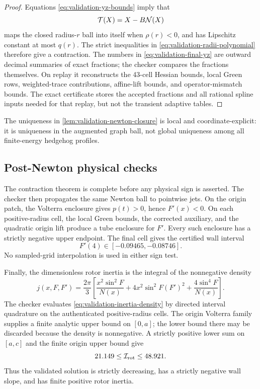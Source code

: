 \begin{proof}
Equations \eqref{eq:validation-yz-bounds} imply that
\[
 \mathcal T(X)=X-B\mathcal N(X)
\]
maps the closed radius-$r$ ball into itself when $\rho(r)<0$, and has Lipschitz
constant at most $q(r)$.  The strict inequalities in
\eqref{eq:validation-radii-polynomial} therefore give a contraction.  The
numbers in \eqref{eq:validation-final-yz} are outward decimal summaries of
exact fractions; the checker compares the fractions themselves.  On replay it
reconstructs the 43-cell Hessian bounds, local Green rows, weighted-trace
contributions, affine-lift bounds, and operator-mismatch bounds.  The exact
certificate stores the accepted fractions and all rational spline inputs
needed for that replay, but not the transient adaptive tables.
\end{proof}

The uniqueness in \cref{lem:validation-newton-closure} is local and
coordinate-explicit: it is uniqueness in the augmented graph ball, not global
uniqueness among all finite-energy hedgehog profiles.

\subsection{Post-Newton physical checks}

The contraction theorem is complete before any physical sign is asserted.
The checker then propagates the same Newton ball to pointwise jets.  On the
origin patch, the Volterra enclosure gives $p(t)>0$, hence $F'(x)<0$.  On each
positive-radius cell, the local Green bounds, the corrected auxiliary, and the
quadratic origin lift produce a tube enclosure for $F'$.  Every such enclosure
has a strictly negative upper endpoint.  The final cell gives the certified
wall interval
\begin{equation}
 F'(4)\in[-0.09465,-0.08746].
 \label{eq:validation-wall-slope}
\end{equation}
No sampled-grid interpolation is used in either sign test.

Finally, the dimensionless rotor inertia is the integral of the nonnegative
density
\begin{equation}
 j(x,F,F')=\frac{2\pi}{3}\left[
 \frac{x^2\sin^2F}{N(x)}+4x^2\sin^2F(F')^2
 +\frac{4\sin^4F}{N(x)}\right].
 \label{eq:validation-inertia-density}
\end{equation}
The checker evaluates \eqref{eq:validation-inertia-density} by directed
interval quadrature on the authenticated positive-radius cells.  The origin
Volterra family supplies a finite analytic upper bound on $[0,a]$; the lower
bound there may be discarded because the density is nonnegative.  A strictly
positive lower sum on $[a,c]$ and the finite origin upper bound give
\begin{equation}
 21.149\leq \mathcal I_{\rm rot}\leq48.921.
 \label{eq:validation-inertia-bound}
\end{equation}
Thus the validated solution is strictly decreasing, has a strictly negative
wall slope, and has finite positive rotor inertia.

